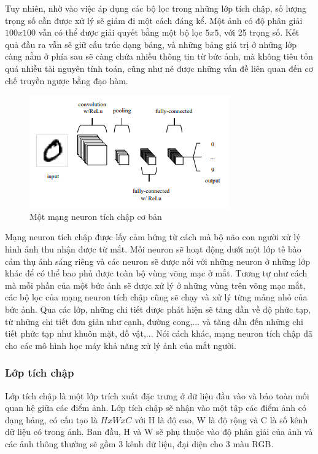 Tuy nhiên, nhờ vào việc áp dụng các bộ lọc trong những lớp tích chập, số lượng trọng số cần được xử lý sẽ giảm đi một cách đáng kể. Một ảnh có độ phân giải $100x100$ vẫn có thể được giải quyết bằng một bộ lọc $5x5$, với 25 trọng số. Kết quả đầu ra vẫn sẽ giữ cấu trúc dạng bảng, và những bảng giá trị ở những lớp càng nằm ở phía sau sẽ càng chứa nhiều thông tin từ bức ảnh, mà không tiêu tốn quá nhiều tài nguyên tính toán, cũng như né được những vấn đề liên quan đến cơ chế truyền ngược bằng đạo hàm.
\begin{figure}[H]
  \centering
  \includegraphics{pics/Chapter3/conv_kernel2.png}
  \caption{Một mạng neuron tích chập cơ bản \cite{o2015introduction}}
  \label{fig:enter-label}
\end{figure}
Mạng neuron tích chập được lấy cảm hứng từ cách mà bộ não con người xử lý hình ảnh thu nhận được từ mắt.  Mỗi neuron sẽ hoạt động dưới một lớp tế bào cảm thụ ánh sáng riêng và các neuron sẽ được nối với những neuron ở những lớp khác để có thể bao phủ được toàn bộ vùng võng mạc ở mắt. Tương tự như cách mà mỗi phần của một bức ảnh sẽ được xử lý ở những vùng trên võng mạc mắt, các bộ lọc của mạng neuron tích chập cũng sẽ chạy và xử lý từng mảng nhỏ của bức ảnh. Qua các lớp, những chi tiết được phát hiện sẽ tăng dần về độ phức tạp, từ những chi tiết đơn giản như cạnh, đường cong,... và tăng dần đến những chi tiết phức tạp như khuôn mặt, đồ vật,... Nói cách khác, mạng neuron tích chập đã cho các mô hình học máy khả năng xử lý ảnh của mắt người.

\subsubsection*{Lớp tích chập}
Lớp tích chập là một lớp trích xuất đặc trưng ở dữ liệu đầu vào và bảo toàn mối quan hệ giữa các điểm ảnh. Lớp tích chập sẽ nhận vào một tập các điểm ảnh có dạng bảng, có cấu tạo là $HxWxC$ với H là độ cao, W là độ rộng và C là số kênh dữ liệu có trong ảnh. Ban đầu, H và W sẽ phụ thuộc vào độ phân giải của ảnh và các ảnh thông thường sẽ gồm 3 kênh dữ liệu, đại diện cho 3 màu RGB.


